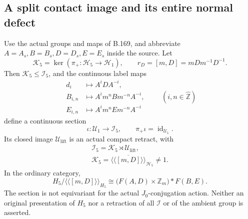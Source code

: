 \subsection*{A split contact image and its entire normal defect}
\label{stmt:B170}
Use the actual groups and maps of B.169, and abbreviate
\(A=A_s,B=B_s,D=D_s,E=E_s\) inside the source.
Let
\[
 \mathcal K_5=\ker(\pi_+:\mathcal H_5\to\mathcal H_1),\qquad
 r_D=[m,D]=mDm^{-1}D^{-1}.
\]
Then \(\mathcal K_5\le\mathcal I_5\), and the continuous label maps
\begin{equation}\label{eq:B170-section-labels}
 \begin{aligned}
 d_i&\longmapsto A^iDA^{-i},\\
 B_{i,n}&\longmapsto A^im^nBm^{-n}A^{-i},\\
 E_{i,n}&\longmapsto A^im^nEm^{-n}A^{-i}
 \end{aligned}
 \qquad(i,n\in\widehat{\mathbb Z})
\end{equation}
define a continuous section
\[
 \iota:\mathcal U_1\longrightarrow\mathcal I_5,\qquad
 \pi_+\iota=\operatorname{id}_{\mathcal U_1}.
\]
Its closed image \(\mathcal U_{\mathrm{lift}}\) is an actual compact
retract, with
\begin{equation}\label{eq:B170-split-kernel}
 \begin{gathered}
 \mathcal I_5=\mathcal K_5\rtimes\mathcal U_{\mathrm{lift}},\\
 \mathcal K_5=
 \overline{\langle\!\langle[m,D]\rangle\!\rangle}_{\mathcal H_5}
 \ne1.
 \end{gathered}
\end{equation}
In the ordinary category,
\begin{equation}\label{eq:B170-discrete-quotient}
 H_5/\langle\!\langle[m,D]\rangle\!\rangle_{H_5}
       \cong\bigl(F(A,D)\times\mathbb Z_m\bigr)*F(B,E).
\end{equation}
The section is not equivariant for the actual \(J_0\)-conjugation action.
Neither an original presentation of \(H_5\) nor a retraction of all
\(\mathcal I\) or of the ambient group is asserted.

